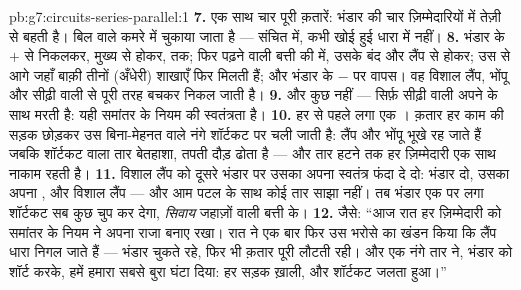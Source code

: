 \begin{solution}{pb:g7:circuits-series-parallel:1}
\textbf{7.} एक साथ चार पूरी क़तारें: भंडार की  चार ज़िम्मेदारियों
में तेज़ी से बहती है। बिल  वाले कमरे में चुकाया जाता है ---
संचित  में, कभी खोई हुई धारा में नहीं।
\textbf{8.} भंडार के $+$ से निकलकर, मुख्य  से होकर,  तक; फिर
पढ़ने वाली बत्ती की  में, उसके बंद  और लैंप से होकर; उस 
से आगे जहाँ बाक़ी तीनों (अँधेरी) शाखाएँ फिर मिलती हैं; और भंडार के $-$
पर वापस। वह विशाल लैंप, भोंपू और सीढ़ी वाली  से पूरी तरह बचकर
निकल जाती है।
\textbf{9.} और कुछ नहीं --- सिर्फ़ सीढ़ी वाली  अपने  के साथ
मरती है: यही समांतर के नियम की स्वतंत्रता है।
\textbf{10.} हर  से पहले लगा एक । क़तार हर काम की सड़क छोड़कर
उस बिना-मेहनत वाले नंगे शॉर्टकट पर चली जाती है: लैंप और भोंपू भूखे रह
जाते हैं जबकि शॉर्टकट वाला तार बेतहाशा, तपती दौड़ ढोता है --- और तार
हटने तक हर ज़िम्मेदारी एक साथ नाकाम रहती है।
\textbf{11.} विशाल लैंप को दूसरे भंडार पर उसका अपना स्वतंत्र फंदा दे
दो: भंडार दो, उसका अपना , और विशाल लैंप --- और आम पटल के साथ कोई
तार साझा नहीं। तब भंडार एक पर लगा शॉर्टकट सब कुछ चुप कर देगा,
\emph{सिवाय} जहाज़ों वाली बत्ती के।
\textbf{12.} जैसे: ``आज रात हर ज़िम्मेदारी को समांतर के नियम ने अपना
राजा बनाए रखा। रात ने एक बार फिर उस भरोसे का खंडन किया कि लैंप धारा
निगल जाते हैं --- भंडार चुकते रहे, फिर भी क़तार पूरी लौटती रही। और एक
नंगे तार ने, भंडार को शॉर्ट करके, हमें हमारा सबसे बुरा घंटा दिया: हर
सड़क ख़ाली, और शॉर्टकट जलता हुआ।''
\end{solution}
